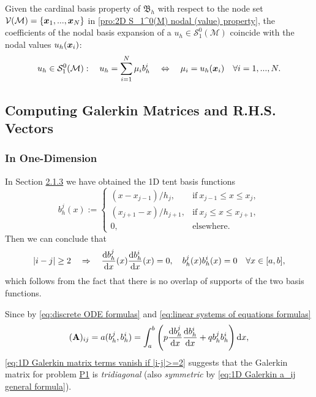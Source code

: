	Given the cardinal basis property of $\mathfrak{B}_h$ with respect to
	the node set $\mathcal{V}(\mathcal{M}) = \{\bm{x}_1,...,\bm{x}_N\}$ in 
	\eqref{pro:2D S_1^0(M) nodal (value) property}, the coefficients of the 
	nodal basis	expansion of a $u_h\in \mathcal{S}_{1}^{0}(\mathcal{M})$ 
	coincide with the nodal	values $u_h(\bm{x}_i)$:
	\begin{equation}
	u_h\in \mathcal{S}_{1}^{0}(\mathcal{M}):\quad 
		u_h=\sum_{i=1}^{N}\mu_i b_h^i \quad\Leftrightarrow\quad 
		\mu_i = u_h(\bm{x}_i) \quad \forall i=1,...,N.
	\end{equation}	
	
	\subsection{Computing Galerkin Matrices and R.H.S. Vectors}
	\subsubsection{In One-Dimension}\label{subsubsection.2.2.1}
	In Section \hyperref[subsubsection.2.1.3]{2.1.3} we have obtained
	the 1D tent basis functions	\[
	b_h^j(x) := 
	\begin{cases}
	(x-x_{j-1})/h_j, 	  & \textrm{if}\ x_{j-1}\leq x\leq x_j,\\
	(x_{j+1}-x)/h_{j+1},  & \textrm{if}\ x_{j}\leq x\leq x_{j+1},\\
	0,					  & \textrm{elsewhere}.	
	\end{cases} \]
	Then we can conclude that
	\begin{equation}\label{eq:1D Galerkin matrix terms vanish if |i-j|>=2}
	|i-j| \geq 2 \quad\Rightarrow\quad
	\frac{\rd b_h^j}{\rd x}(x)\frac{\rd b_h^i}{\rd x}(x)=0,\quad
	b_h^j(x) b_h^i(x)=0 \quad \forall x\in[a,b],
	\end{equation}	
	which follows from the fact that there is no overlap of supports
	of the two basis functions.
		
	Since by \eqref{eq:discrete ODE formulas}
	and  \eqref{eq:linear systems of equations formulas}
	\begin{equation}\label{eq:1D Galerkin a_ij general formula}
	(\mathbf{A})_{ij}=a(b_h^j,b_h^i)=\int_{a}^{b}\left(	
	p\frac{\mathrm{d} b_h^j}{\mathrm{d} x}\frac{\mathrm{d} b_h^i}{\mathrm{d} x}+q b_h^j b_h^i\right)\mathrm{d} x,
	\end{equation}
	\eqref{eq:1D Galerkin matrix terms vanish if |i-j|>=2} suggests that the 
	Galerkin matrix for problem \hyperlink{P1}{P1} is \emph{tridiagonal} 
	(also \emph{symmetric} by \eqref{eq:1D Galerkin a_ij general formula}).
	\vspace{8pt}
	
